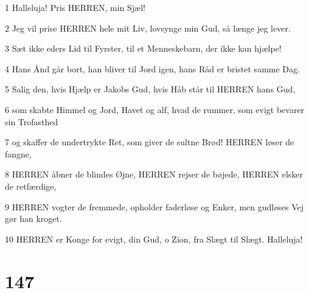 \par 1 Halleluja! Pris HERREN, min Sjæl!
\par 2 Jeg vil prise HERREN hele mit Liv, lovsynge min Gud, så længe jeg lever.
\par 3 Sæt ikke eders Lid til Fyrster, til et Menneskebarn, der ikke kan hjælpe!
\par 4 Hans Ånd går bort, han bliver til Jord igen, hans Råd er bristet samme Dag.
\par 5 Salig den, hvis Hjælp er Jakobs Gud, hvis Håb står til HERREN hans Gud,
\par 6 som skabte Himmel og Jord, Havet og alf, hvad de rummer, som evigt bevarer sin Trofasthed
\par 7 og skaffer de undertrykte Ret, som giver de sultne Brød! HERREN løser de fangne,
\par 8 HERREN åbner de blindes Øjne, HERREN rejser de bøjede, HERREN elsker de retfærdige,
\par 9 HERREN vogter de fremmede, opholder faderløse og Enker, men gudløses Vej gør han kroget.
\par 10 HERREN er Konge for evigt, din Gud, o Zion, fra Slægt til Slægt. Halleluja!

\chapter{147}

